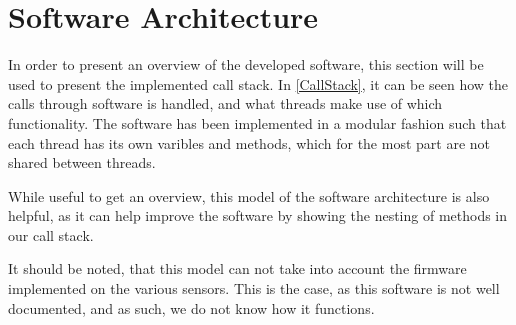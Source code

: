 \section{Software Architecture}
In order to present an overview of the developed software, this section will be
used to present the implemented call stack. In \autoref{CallStack}, it can be
seen how the calls through software is handled, and what threads make use of
which functionality. The software has been implemented in a modular fashion such
that each thread has its own varibles and methods, which for the most part are
not shared between threads.\nl

While useful to get an overview, this model of the software architecture is also
helpful, as it can help improve the software by showing the nesting of methods
in our call stack.


It should be noted, that this model can not take into account the firmware
implemented on the various sensors. This is the case, as this software is not
well documented, and as such, we do not know how it functions.

